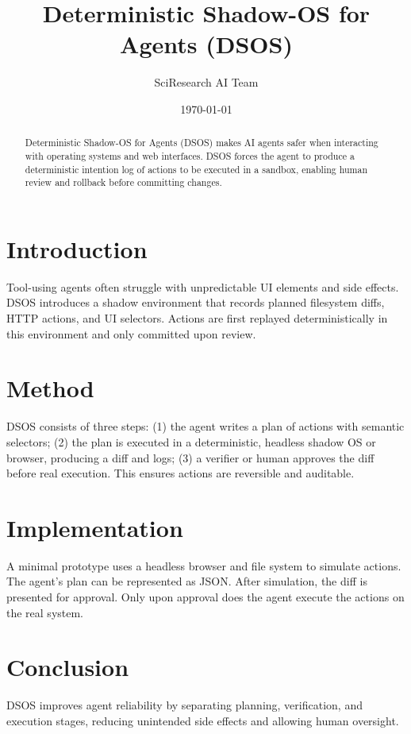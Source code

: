 \documentclass{article}
\title{Deterministic Shadow-OS for Agents (DSOS)}
\author{SciResearch AI Team}
\date{\today}
\begin{document}
\maketitle
\begin{abstract}
Deterministic Shadow-OS for Agents (DSOS) makes AI agents safer when
interacting with operating systems and web interfaces. DSOS forces the
agent to produce a deterministic intention log of actions to be
executed in a sandbox, enabling human review and rollback before
committing changes.
\end{abstract}
\section{Introduction}
Tool-using agents often struggle with unpredictable UI elements and
side effects. DSOS introduces a shadow environment that records planned
filesystem diffs, HTTP actions, and UI selectors. Actions are first
replayed deterministically in this environment and only committed upon
review.
\section{Method}
DSOS consists of three steps: (1) the agent writes a plan of actions
with semantic selectors; (2) the plan is executed in a deterministic,
headless shadow OS or browser, producing a diff and logs; (3) a
verifier or human approves the diff before real execution. This ensures
actions are reversible and auditable.
\section{Implementation}
A minimal prototype uses a headless browser and file system to simulate
actions. The agent's plan can be represented as JSON. After simulation,
the diff is presented for approval. Only upon approval does the agent
execute the actions on the real system.
\section{Conclusion}
DSOS improves agent reliability by separating planning, verification,
and execution stages, reducing unintended side effects and allowing
human oversight.
\end{document}
